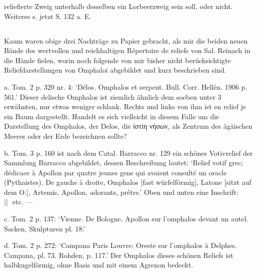 \documentclass[a4paper, 11pt, oneside]{article}
\newcommand*\svgABV{}
\newcommand*\svgABW{}
\newcommand*\svgABX{}
\newcommand*\svgABY{}
\newcommand*\svgABZ{}
\begin{document}
reliefierte Zweig unterhalb desselben ein Lorbeerzweig sein soll, oder nicht. Weiteres s. jetzt S. 132 a. E.

\subsection{}
\paragraph{}
Kaum waren obige drei Nachträge zu Papier gebracht, als mir die beiden neuen Bände des wertvollen und reichhaltigen Répertoire de reliefs von Sal. Reinach in die Hände fielen, worin noch folgende von mir bisher nicht berücksichtigte Reliefdarstellungen von Omphaloi abgebildet und kurz beschrieben sind.

a. Tom. 2 p. 320 nr. 4: `Délos. Omphalos et serpent. Bull. Corr. Hellén. 1906 p. 561.' Dieser delische Omphalos ist ziemlich ähnlich dem soeben unter 3 erwähnten, nur etwas weniger schlank. Rechts und links von ihm ist en relief je ein Baum dargestellt. Handelt es sich vielleicht in diesem Falle um die Darstellung des Omphalos, der Delos, die ἱστίη νήσων, als Zentrum des ägäischen Meeres oder der Erde bezeichnen sollte?

b. Tom. 3 p. 160 ist nach dem Catal. Barracco nr. 129 ein schönes Votivrelief der Sammlung Barracco abgebildet, dessen Beschreibung lautet: `Relief votif grec; dédicace à Apollon par quatre jeunes gens qui avaient consulté un oracle (Pythaistes). De gauche à droite, Omphalos [fast würfelförmig], Latone [sitzt auf dem O.], Artemis, Apollon, adorants, prêtre.' Oben und unten eine Inschrift: $\svgABV\enspace\svgABW\enspace\svgABX\enspace\svgABY$ || $\svgABZ$ etc. ---

c. Tom. 2 p. 137: `Vienne. De Bologne. Apollon sur l'omphalos devant un autel. Sacken, Skulpturen pl. 18.'

d. Tom. 2 p. 272: `Campana Paris Louvre: Oreste sur l'omphalos à Delphes. Campana, pl. 73. Rohden, p. 117.' Der Omphalos dieses schönen Reliefs ist halbkugelförmig, ohne Basis und mit einem Agrenon bedeckt.

\subsection{}
\end{document}
